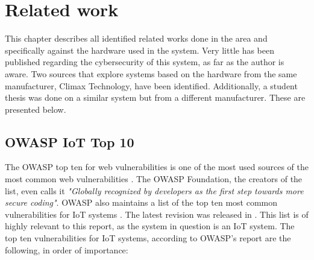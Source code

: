 \chapter{Related work} \label{ch:related-work}
This chapter describes all identified related works done in the area and specifically against the hardware used in the system. Very little has been published regarding the cybersecurity of this system, as far as the author is aware. Two sources that explore systems based on the hardware from the same manufacturer, Climax Technology, have been identified. Additionally, a student thesis was done on a similar system but from a different manufacturer. These are presented below.

\section{OWASP IoT Top 10}
The OWASP top ten for web vulnerabilities is one of the most used sources of the most common web vulnerabilities \cite{owasp-www-top10}. The OWASP Foundation, the creators of the list, even calls it \textit{"Globally recognized by developers as the first step towards more secure coding"}. OWASP also maintains a list of the top ten most common vulnerabilities for IoT systems \cite{owasp-iot-top10}. The latest revision was released in \citeyear{owasp-iot-top10}. This list is of highly relevant to this report, as the system in question is an IoT system. The top ten vulnerabilities for IoT systems, according to OWASP's report are the following, in order of importance:
